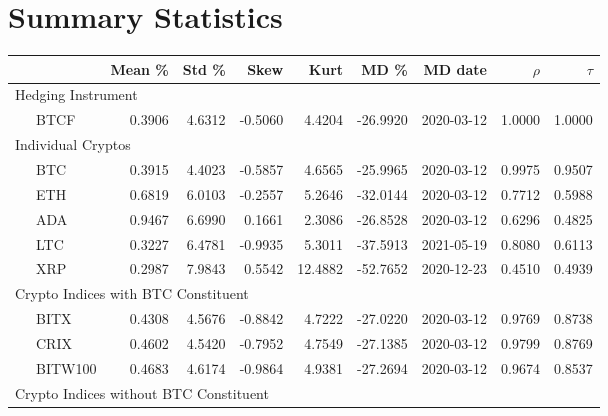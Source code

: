 \documentclass[11pt,a4paper,english]{article}
\begin{document}

%
% 
% 

\section{Summary Statistics}\label{appendix:summary_stats}

{\small %
  \begin{table}[th] \centering %
    {%
\begin{tabular}{lrrrrrrrr} \toprule
         {} &    Mean \% &     Std \% &      Skew &       Kurt &         MD \% &     MD date & $\rho$ & $\tau$ \\
\midrule
     \multicolumn{9}{l}{Hedging Instrument} \\
\ \ \ BTCF    &  0.3906 &  4.6312 & -0.5060 &   4.4204 & -26.9920 &  2020-03-12 &  1.0000 &  1.0000 \\
     \multicolumn{9}{l}{Individual Cryptos}                                                                                 \\
\ \ \ BTC     &  0.3915 &  4.4023 & -0.5857 &   4.6565 & -25.9965 &  2020-03-12 &  0.9975 &  0.9507 \\
\ \ \ ETH     &  0.6819 &  6.0103 & -0.2557 &   5.2646 & -32.0144 &  2020-03-12 &  0.7712 &  0.5988 \\
\ \ \ ADA     &  0.9467 &  6.6990 &  0.1661 &   2.3086 & -26.8528 &  2020-03-12 &  0.6296 &  0.4825 \\
\ \ \ LTC     &  0.3227 &  6.4781 & -0.9935 &   5.3011 & -37.5913 &  2021-05-19 &  0.8080 &  0.6113 \\
\ \ \ XRP     &  0.2987 &  7.9843 &  0.5542 &  12.4882 & -52.7652 &  2020-12-23 &  0.4510 &  0.4939 \\
   \multicolumn{9}{l}{Crypto Indices with BTC Constituent}                                                                  \\
\ \ \ BITX    &  0.4308 &  4.5676 & -0.8842 &   4.7222 & -27.0220 &  2020-03-12 &  0.9769 &  0.8738 \\
\ \ \ CRIX    &  0.4602 &  4.5420 & -0.7952 &   4.7549 & -27.1385 &  2020-03-12 &  0.9799 &  0.8769 \\
\ \ \ BITW100 &  0.4683 &  4.6174 & -0.9864 &   4.9381 & -27.2694 &  2020-03-12 &  0.9674 &  0.8537 \\
    \multicolumn{9}{l}{Crypto Indices without BTC Constituent}                                                              \\

\end{tabular}}
\end{table}}
\end{document}
